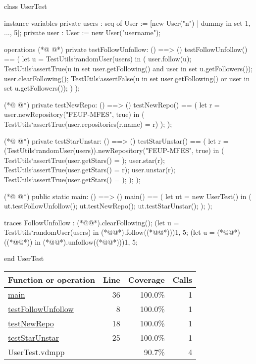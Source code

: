 \begin{vdmpp}[breaklines=true]
class UserTest

 instance variables
  private users : seq of User := [new User("n") | dummy in set {1, ..., 5}];
  private user : User := new User("username");
 
 operations
(*@
\label{testFollowUnfollow:8}
@*)
  private testFollowUnfollow: () ==> ()
  testFollowUnfollow() == (
   let u = TestUtils`randomUser(users) in (
    user.follow(u);
    TestUtils`assertTrue(u in set user.getFollowing() and user in set u.getFollowers());
    user.clearFollowing();
    TestUtils`assertFalse(u in set user.getFollowing() or user in set u.getFollowers());
   )
  );
  
(*@
\label{testNewRepo:18}
@*)
  private testNewRepo: () ==> ()
  testNewRepo() == (
   let r = user.newRepository("FEUP-MFES", true) in (
    TestUtils`assertTrue(user.repositories(r.name) = r)
   );
  );
  
(*@
\label{testStarUnstar:25}
@*)
  private testStarUnstar: () ==> ()
  testStarUnstar() == (
   let r = (TestUtils`randomUser(users)).newRepository("FEUP-MFES", true) in (
    TestUtils`assertTrue(user.getStars() = {});
    user.star(r);
    TestUtils`assertTrue(user.getStars() = {r});
    user.unstar(r);
    TestUtils`assertTrue(user.getStars() = {});
   );
  );
 
(*@
\label{main:36}
@*)
  public static main: () ==> ()
  main() == (
   let ut = new UserTest() in (
    ut.testFollowUnfollow();
    ut.testNewRepo();
    ut.testStarUnstar();
   );
  );

 traces
  FollowUnfollow :
   (*@@*).clearFollowing();
   (let u = TestUtils`randomUser(users) in (*@@*).follow((*@@*))){1, 5};
   (let u = (*@@*)((*@@*)) in (*@@*).unfollow((*@@*))){1, 5};

end UserTest
\end{vdmpp}
\bigskip
\begin{longtable}{|l|r|r|r|}
\hline
Function or operation & Line & Coverage & Calls \\
\hline
\hline
\hyperref[main:36]{main} & 36&100.0\% & 1 \\
\hline
\hyperref[testFollowUnfollow:8]{testFollowUnfollow} & 8&100.0\% & 1 \\
\hline
\hyperref[testNewRepo:18]{testNewRepo} & 18&100.0\% & 1 \\
\hline
\hyperref[testStarUnstar:25]{testStarUnstar} & 25&100.0\% & 1 \\
\hline
\hline
UserTest.vdmpp & & 90.7\% & 4 \\
\hline
\end{longtable}

